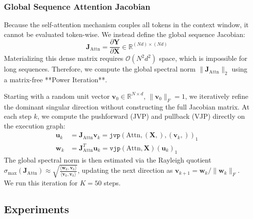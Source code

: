 \documentclass[a4paper,12pt]{article}
\begin{document}



    \subsubsection{Global Sequence Attention Jacobian}
    Because the self-attention mechanism couples all tokens in the context window, it cannot be evaluated token-wise. We instead define the global sequence Jacobian:
    \begin{equation}
        \mathbf{J}_{\text{Attn}} = \frac{\partial \mathbf{Y}}{\partial \mathbf{X}} \in \mathbb{R}^{(N d) \times (N d)}
    \end{equation}
    Materializing this dense matrix requires $\mathcal{O}(N^2 d^2)$ space, which is impossible for long sequences. Therefore, we compute the global spectral norm $\|\mathbf{J}_{\text{Attn}}\|_2$ using a matrix-free **Power Iteration**. 

    Starting with a random unit vector $\mathbf{v}_0 \in \mathbb{R}^{N \times d}$, $\|\mathbf{v}_0\|_F = 1$, we iteratively refine the dominant singular direction without constructing the full Jacobian matrix. At each step $k$, we compute the pushforward (JVP) and pullback (VJP) directly on the execution graph:
    \begin{align}
        \mathbf{u}_k &= \mathbf{J}_{\text{Attn}} \mathbf{v}_k = \texttt{jvp}(\text{Attn}, (\mathbf{X},), (\mathbf{v}_k,))_1 \\
        \mathbf{w}_k &= \mathbf{J}_{\text{Attn}}^T \mathbf{u}_k = \texttt{vjp}(\text{Attn}, \mathbf{X})(\mathbf{u}_k)_1
    \end{align}
    The global spectral norm is then estimated via the Rayleigh quotient $\sigma_{\max}(\mathbf{J}_{\text{Attn}}) \approx \sqrt{\frac{\langle \mathbf{w}_k, \mathbf{v}_k \rangle}{\langle \mathbf{v}_k, \mathbf{v}_k \rangle}}$, updating the next direction as $\mathbf{v}_{k+1} = \mathbf{w}_k / \|\mathbf{w}_k\|_F$. We run this iteration for $K = 50$ steps. 


    \subsection{Experiments} %
    \label{subsec:experiments}
\end{document}
